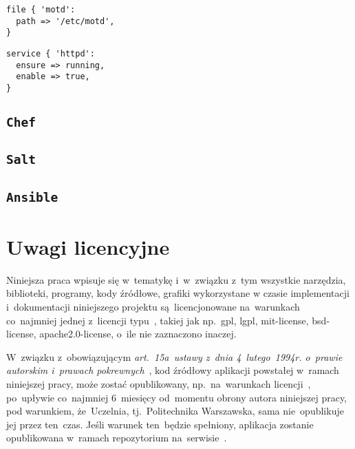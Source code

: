 \documentclass[thesis]{subfiles}
\begin{document}
\begin{lstlisting}[numbers=none,caption={Manifest \texttt{Puppet} gwarantujący istnienie pliku \hreftt{https://en.wikipedia.org/wiki/Motd_(Unix)}{/etc/motd}},label=puppet-motd-example]
file { 'motd':
  path => '/etc/motd',
}
\end{lstlisting}

\begin{lstlisting}[numbers=none,caption={Manifest \texttt{Puppet} gwarantujący, że \gls{daemon} \hreftt{https://httpd.apache.org/}{httpd} jest włączony i~działa},label=puppet-httpd-example]
service { 'httpd':
  ensure => running,
  enable => true,
}
\end{lstlisting}

\subsection{\texttt{Chef}}
\subsection{\texttt{Salt}}
\subsection{\texttt{Ansible}}


\section{Uwagi licencyjne}

Niniejsza praca wpisuje się w~tematykę  i~w~związku z~tym wszystkie narzędzia, biblioteki, programy, kody źródłowe, grafiki wykorzystane w czasie implementacji i~dokumentacji niniejszego projektu są~licencjonowane na~warunkach co~najmniej jednej z~licencji typu~, takiej jak np.~\gls{gpl}, \gls{lgpl}, \gls{mit-license}, \gls{bsd-license}, \gls{apache2.0-license}, o~ile nie zaznaczono inaczej.

W~związku z~obowiązującym \emph{art.~15a~ustawy z~dnia 4~lutego~1994r. o~prawie autorskim i~prawach pokrewnych}~\cite{papp}, kod źródłowy aplikacji powstałej w~ramach niniejszej pracy, może zostać opublikowany, np.~na~warunkach licencji~, po~upływie co~najmniej 6~miesięcy od~momentu obrony autora niniejszej pracy, pod warunkiem, że~Uczelnia, tj.~Politechnika Warszawska, sama nie~opublikuje jej przez ten~czas. Jeśli warunek ten~będzie spełniony, aplikacja zostanie opublikowana w~ramach repozytorium na~serwisie~.
\end{document}

